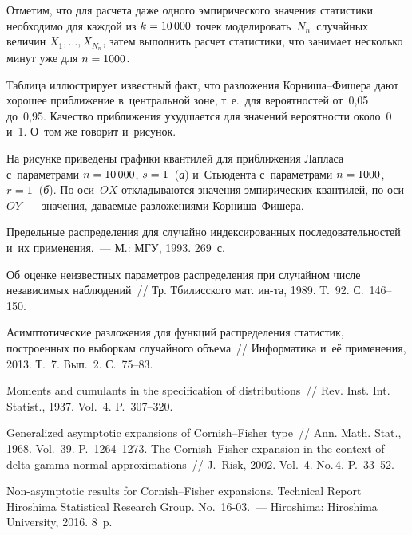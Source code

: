 \begin{multicols}{2}
Отметим, что для расчета даже одного эмпирического значения статистики  
необходимо для каж\-дой из $k\hm=10\,000$ точек моделировать~$N_n$~случайных 
величин $X_1,\ldots, X_{N_n}$, затем выполнить расчет статистики, что занимает 
несколько минут уже для $n\hm=1000$.

Таблица  иллюстрирует известный факт, что разложения Кор\-ни\-ша--Фи\-ше\-ра
дают хорошее приближение в~центральной зоне, т.\,е.\ для вероятностей
от~0,05 до~0,95. Качество приближения ухудшается для значений
вероятности около~0 и~1. О~том же говорит и~рисунок.

На рисунке приведены графики квантилей для приближения Лапласа 
с~параметрами $n\hm=10\,000$, $s\hm=1$~(\textit{а}) и~Стьюдента с~параметрами
$n\hm=1000$, $r\hm=1$~(\textit{б}). По оси~$OX$ откладываются значения
эмпирических квантилей, по оси $OY$~--- значения, даваемые
разложениями Кор\-ни\-ша--Фи\-шера.

\vspace*{-6pt}

{\small\frenchspacing
 {%
 \begin{thebibliography}{9}
 Предельные распределения для случайно
индексированных последовательностей и~их применения.~--- М.: МГУ,
1993. 269~с.

\columnbreak

 Об оценке неизвестных параметров распределения
при случайном числе независимых наблюдений~// Тр. Тбилисского
мат. ин-та, 1989. Т.~92. С.~146--150.

   Асимптотические
разложения для функций распределения статистик, построенных по
выборкам случайного объема~// Информатика и~её применения, 2013.
Т.~7. Вып.~2. С.~75--83.

  Moments and cumulants in the
specification of distributions~// Rev. Inst. Int. Statist.,
1937. Vol.~4. P.~307--320.

 Generalized asymptotic expansions of
Cornish--Fisher type~// Ann. Math. Stat., 1968.
Vol.~39. P.~1264--1273.
 The Cornish--Fisher expansion in the context of
delta-gamma-normal approximations~// J.~Risk, 2002. Vol.~4.
No.\,4. P.~33--52.

  Non-asymptotic
results for Cornish--Fisher expansions. Technical Report Hiroshima
Statistical Research Group. No.~16-03.~--- Hiroshima: Hiroshima
University, 2016. 8~p. 


\end{thebibliography}}}
\end{multicols}
